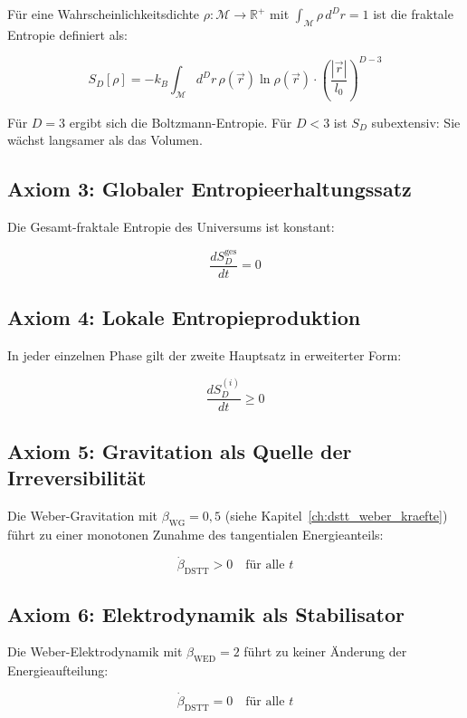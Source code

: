 Für eine Wahrscheinlichkeitsdichte \( \rho : \mathcal{M} \to \mathbb{R}^+ \) mit \( \int_{\mathcal{M}} \rho \, d^D r = 1 \) ist die fraktale Entropie definiert als:

\[
S_D[\rho] = -k_B \int_{\mathcal{M}} d^D r \, \rho(\vec{r}) \ln \rho(\vec{r}) \cdot \left( \frac{|\vec{r}|}{l_0} \right)^{D-3}
\]

Für \( D = 3 \) ergibt sich die Boltzmann-Entropie. Für \( D < 3 \) ist \( S_D \) subextensiv: Sie wächst langsamer als das Volumen.

\subsection{Axiom 3: Globaler Entropieerhaltungssatz}
\label{sub:entropie_axiom3}

Die Gesamt-fraktale Entropie des Universums ist konstant:

\[
\frac{dS_D^{\text{ges}}}{dt} = 0
\]

\subsection{Axiom 4: Lokale Entropieproduktion}
\label{sub:entropie_axiom4}

In jeder einzelnen Phase gilt der zweite Hauptsatz in erweiterter Form:

\[
\frac{dS_D^{(i)}}{dt} \geq 0
\]

\subsection{Axiom 5: Gravitation als Quelle der Irreversibilität}
\label{sub:entropie_axiom5}

Die Weber-Gravitation mit \( \beta_{\text{WG}} = 0,5 \) (siehe Kapitel~\ref{ch:dstt_weber_kraefte}) führt zu einer monotonen Zunahme des tangentialen Energieanteils:

\[
\dot{\beta}_{\text{DSTT}} > 0 \quad \text{für alle } t
\]

\subsection{Axiom 6: Elektrodynamik als Stabilisator}
\label{sub:entropie_axiom6}

Die Weber-Elektrodynamik mit \( \beta_{\text{WED}} = 2 \) führt zu keiner Änderung der Energieaufteilung:

\[
\dot{\beta}_{\text{DSTT}} = 0 \quad \text{für alle } t
\]

